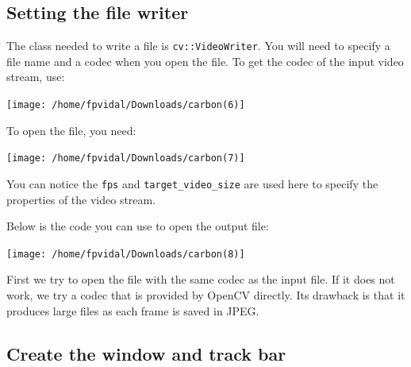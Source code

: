 \documentclass[english,a4paper,12pt,oneside]{article}
\begin{document}
\newpage
\subsection{Setting the file writer}
The class needed to write a file is \verb+cv::VideoWriter+. 
You will need to specify a file name and a codec when you open the file. 
To get the codec of the input video stream, use:

\texttt{[image: /home/fpvidal/Downloads/carbon(6)]}

To open the file, you need:

\texttt{[image: /home/fpvidal/Downloads/carbon(7)]}

You can notice the \verb+fps+ and \verb+target_video_size+ are used here to specify the properties of the video stream. 

Below is the code you can use to open the output file:

% 
% 
% 
\texttt{[image: /home/fpvidal/Downloads/carbon(8)]}

First we try to open the file with the same codec as the input file. 
If it does not work, we try a codec that is provided by OpenCV directly. 
Its drawback is that it produces large files as each frame is saved in JPEG. 


\subsection{Create the window and track bar}
\end{document}
